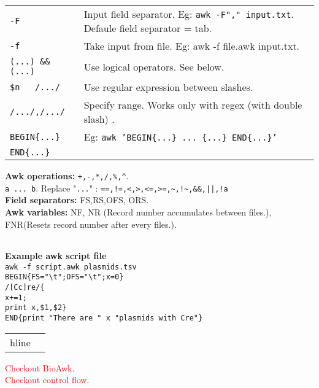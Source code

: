 \begin{tabularx}{\linewidth}{lX}
    \texttt{-F} & Input field separator. Eg: \texttt{awk -F"," input.txt}. Defaule field separator = tab.\\
    \texttt{-f} & Take input from file. Eg: awk -f file.awk input.txt.\\
    \texttt{(...) \&\& (...)} &  Use logical operators. See below.\\
    \texttt{\$n ~ /.../} & Use regular expression between slashes.\\
    \texttt{/.../,/.../} & Specify range. Works only with regex (with double slash) .\\
    \texttt{BEGIN\{...\}} & Eg: \texttt{awk 'BEGIN\{...\} ... \{...\} END\{...\}'}\\
    \texttt{END\{...\}} & \\
    \hline
\end{tabularx}

\textbf{Awk operations:} \texttt{+,-,*,/,\%,\^{}}. \\
\texttt{a ... b}. Replace "\texttt{...}" : \texttt{==,!=,<,>,<=,>=,\~{},!\~{},\&\&,||,!a}\\
\textbf{Field separators:} FS,RS,OFS, ORS.\\
\textbf{Awk variables:} NF, NR (Record number accumulates between files.), FNR(Resets record number after every files.).\\

\begin{tabularx}{\linewidth}{lX}
    \hline
\end{tabularx}

\textbf{Example awk script file}\\
\texttt{awk -f script.awk plasmids.tsv}\\
\texttt{BEGIN\{FS="\textbackslash t";OFS="\textbackslash t";x=0\}}\\
\texttt{/[Cc]re/\{}\\
\texttt{x+=1;}\\
\texttt{print x,\$1,\$2\}}\\
\texttt{END\{print "There are " x "plasmids with Cre"\}}

\begin{tabularx}{\linewidth}{lX}
    hline
\end{tabularx}

\textcolor{red}{Checkout BioAwk}.\\
\textcolor{red}{Checkout control flow}.\\
\begin{tabularx}{\linewidth}{lX}
\hline
\end{tabularx}

